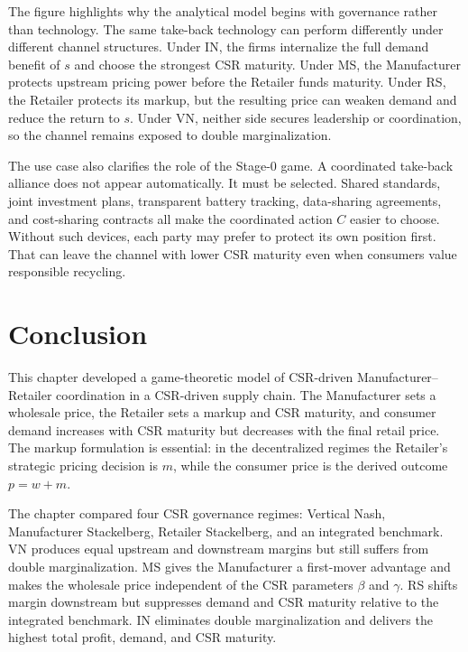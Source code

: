 The figure highlights why the analytical model begins with governance rather than technology. The same take-back technology can perform differently under different channel structures. Under IN, the firms internalize the full demand benefit of $s$ and choose the strongest CSR maturity. Under MS, the Manufacturer protects upstream pricing power before the Retailer funds maturity. Under RS, the Retailer protects its markup, but the resulting price can weaken demand and reduce the return to $s$. Under VN, neither side secures leadership or coordination, so the channel remains exposed to double marginalization.

The use case also clarifies the role of the Stage-0 game. A coordinated take-back alliance does not appear automatically. It must be selected. Shared standards, joint investment plans, transparent battery tracking, data-sharing agreements, and cost-sharing contracts all make the coordinated action \(C\) easier to choose. Without such devices, each party may prefer to protect its own position first. That can leave the channel with lower CSR maturity even when consumers value responsible recycling.

\section{Conclusion}
\label{sec:ch3_conclusion}

This chapter developed a game-theoretic model of CSR-driven Manufacturer--Retailer coordination in a CSR-driven supply chain. The Manufacturer sets a wholesale price, the Retailer sets a markup and CSR maturity, and consumer demand increases with CSR maturity but decreases with the final retail price. The markup formulation is essential: in the decentralized regimes the Retailer's strategic pricing decision is $m$, while the consumer price is the derived outcome $p=w+m$.

The chapter compared four CSR governance regimes: Vertical Nash, Manufacturer Stackelberg, Retailer Stackelberg, and an integrated benchmark. VN produces equal upstream and downstream margins but still suffers from double marginalization. MS gives the Manufacturer a first-mover advantage and makes the wholesale price independent of the CSR parameters $\beta$ and $\gamma$. RS shifts margin downstream but suppresses demand and CSR maturity relative to the integrated benchmark. IN eliminates double marginalization and delivers the highest total profit, demand, and CSR maturity.

